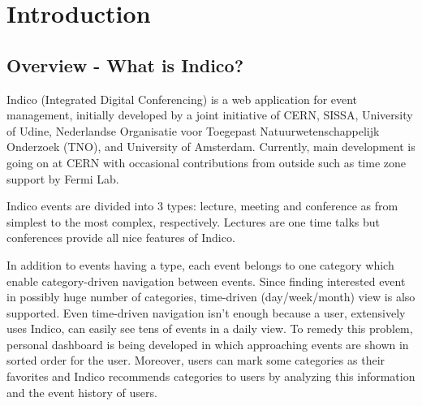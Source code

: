

\chapter{Introduction}

\ifpdf
    \graphicspath{{1_introduction/figures/PNG/}{1_introduction/figures/PDF/}{1_introduction/figures/}}
\else
    \graphicspath{{1_introduction/figures/EPS/}{1_introduction/figures/}}
\fi

\section{Overview - What is Indico?} %

Indico (Integrated Digital Conferencing) is a web application for event management, initially developed by a joint initiative of CERN, SISSA, University of Udine, Nederlandse Organisatie voor Toegepast Natuurwetenschappelijk Onderzoek (TNO), and University of Amsterdam. Currently, main development is going on at CERN with occasional contributions from outside such as time zone support by Fermi Lab.

\par Indico events are divided into 3 types: lecture, meeting and conference as from simplest to the most complex, respectively. Lectures are one time talks but conferences provide all nice features of Indico.

\par In addition to events having a type, each event belongs to one category which enable category-driven navigation between events. Since finding interested event in possibly huge number of categories, time-driven (day/week/month) view is also supported. Even time-driven navigation isn't enough because a user, extensively uses Indico, can easily see tens of events in a daily view. To remedy this problem, personal dashboard is being developed in which approaching events are shown in sorted order for the user. Moreover, users can mark some categories as their favorites and Indico recommends categories to users by analyzing this information and the event history of users.

